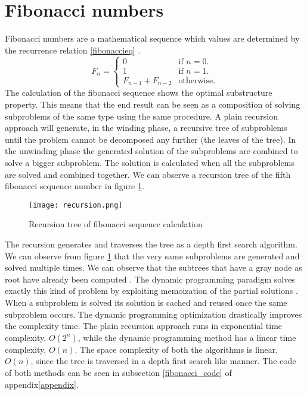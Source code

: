 \documentclass[runningheads]{llncs}
\begin{document}
\section{Fibonacci numbers}
Fibonacci numbers are a mathematical sequence which values are
determined by the recurrence relation \ref{fibonaccieq}
\cite{fib_num}.
\begin{equation}\label{fibonaccieq}
  F_n=\begin{cases}
  0 & \text{if $n=0$}.\\
  1 & \text{if $n=1$}.\\
  F_{n-1} + F_{n-2} & \text{otherwise}.
  \end{cases}
\end{equation}
The calculation of the fibonacci sequence shows the optimal
substructure property. This means that the end result can be seen as a
composition of solving subproblems of the same type using the same
procedure. A plain recursion approach will generate, in the winding
phase, a recursive tree of subproblems until the problem cannot be
decomposed any further (the leaves of the tree). In the unwinding
phase the generated solution of the subproblems are combined to solve
a bigger subproblem. The solution is calculated when all the
subproblems are solved and combined together. We can observe a
recursion tree of the fifth fibonacci sequence number in figure \ref{fig1}.
\begin{figure}
\texttt{[image: recursion.png]}
\caption{Recursion tree of fibonacci sequence calculation} \label{fig1}
\end{figure}
The recursion generates and traverses the tree as a depth first search
algorithm. We can observe from figure \ref{fig1} that the very same
subproblems are generated and solved multiple times. We can observe
that the subtrees that have a gray node as root have already been
computed \cite{fibo}. The dynamic programming paradigm solves exactly
this kind of problem by exploiting memoization of the partial
solutions \cite{dprogramming}. When a subproblem is solved its
solution is cached and reused once the same subproblem occurs. The
dynamic programming optimization drastically improves the complexity
time. The plain recursion approach runs in exponential time complexity,
$O(2^n)$, while the dynamic programming method has a linear time
complexity, $O(n)$. The space complexity of both the algorithms is
linear, $O(n)$, since the tree is traversed in a depth first search
like manner. The code of both methods can be seen in subsection
\ref{fibonacci_code} of appendix\ref{appendix}.
\end{document}
